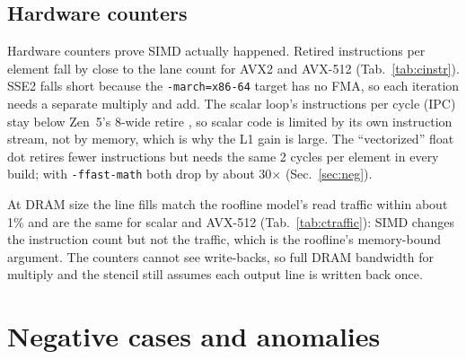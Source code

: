 \documentclass{article}
\begin{document}
\subsection{Hardware counters}\label{sec:counters}
\begin{table}[!htb]\centering\small\resizebox{0.8\linewidth}{!}{}
\caption{Retired instructions, cycles and loads per element, f32, L1-resident ($n=2048$, three arrays totalling 24\,KiB). One run per row; the reduction is the scalar instruction count divided by that of the build.}\label{tab:cinstr}\end{table}
\begin{table}[!htb]\centering\small\resizebox{\linewidth}{!}{}
\caption{Cache-line fills per element at DRAM size, three arrays of 128\,MiB, summed over L2, L3 and DRAM as sources. The DRAM share differs between kernels only because the hardware prefetcher stages lines in L2 first when the loop is slow enough.}\label{tab:ctraffic}\end{table}
Hardware counters prove SIMD actually happened. Retired instructions per element fall by close to the lane count for AVX2 and AVX-512 (Tab.~\ref{tab:cinstr}). SSE2 falls short because the \texttt{-march=x86-64} target has no FMA, so each iteration needs a separate multiply and add. The scalar loop's instructions per cycle (IPC) stay below Zen~5's 8-wide retire \cite{amdhc}, so scalar code is limited by its own instruction stream, not by memory, which is why the L1 gain is large. The ``vectorized'' float dot retires fewer instructions but needs the same 2 cycles per element in every build; with \texttt{-ffast-math} both drop by about 30$\times$ (Sec.~\ref{sec:neg}).

At DRAM size the line fills match the roofline model's read traffic within about 1\% and are the same for scalar and AVX-512 (Tab.~\ref{tab:ctraffic}): SIMD changes the instruction count but not the traffic, which is the roofline's memory-bound argument. The counters cannot see write-backs, so full DRAM bandwidth for multiply and the stencil still assumes each output line is written back once.

\section{Negative cases and anomalies}\label{sec:negan}
\end{document}
